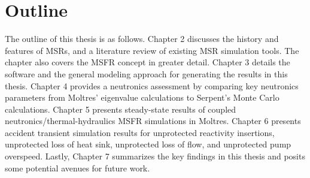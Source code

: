 \section{Outline}

The outline of this thesis is as follows. Chapter 2 discusses the history and
features of \glspl{MSR}, and a literature review of existing \gls{MSR}
simulation tools. The chapter also covers the \gls{MSFR} concept in greater
detail. Chapter 3 details the software and the general modeling
approach for generating the results in this thesis. Chapter 4 provides a
neutronics assessment by comparing key neutronics parameters from Moltres'
eigenvalue calculations to Serpent's Monte Carlo calculations. Chapter 5
presents steady-state results of coupled neutronics/thermal-hydraulics
\gls{MSFR} simulations in Moltres. Chapter 6 presents accident transient
simulation results for unprotected reactivity insertions, unprotected loss of
heat sink, unprotected loss of flow, and unprotected pump overspeed. Lastly,
Chapter 7 summarizes the key findings in this thesis
and posits some potential avenues for future work.
